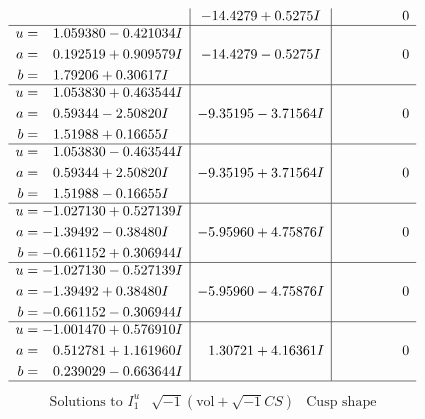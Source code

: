 \documentclass[1p]{elsarticle_modified}
\theoremstyle{definition}
\newcommand{\I}{\sqrt{-1}}
\begin{document}
$$\begin{array}{c|c|c}
 & -14.4279 + 0.5275 I & \phantom{-0.000000 } 0 \\ \hline\begin{aligned}
u &= \phantom{-}1.059380 - 0.421034 I \\
a &= \phantom{-}0.192519 + 0.909579 I \\
b &= \phantom{-}1.79206 + 0.30617 I\end{aligned}
 & -14.4279 - 0.5275 I & \phantom{-0.000000 } 0 \\ \hline\begin{aligned}
u &= \phantom{-}1.053830 + 0.463544 I \\
a &= \phantom{-}0.59344 - 2.50820 I \\
b &= \phantom{-}1.51988 + 0.16655 I\end{aligned}
 & -9.35195 - 3.71564 I & \phantom{-0.000000 } 0 \\ \hline\begin{aligned}
u &= \phantom{-}1.053830 - 0.463544 I \\
a &= \phantom{-}0.59344 + 2.50820 I \\
b &= \phantom{-}1.51988 - 0.16655 I\end{aligned}
 & -9.35195 + 3.71564 I & \phantom{-0.000000 } 0 \\ \hline\begin{aligned}
u &= -1.027130 + 0.527139 I \\
a &= -1.39492 - 0.38480 I \\
b &= -0.661152 + 0.306944 I\end{aligned}
 & -5.95960 + 4.75876 I & \phantom{-0.000000 } 0 \\ \hline\begin{aligned}
u &= -1.027130 - 0.527139 I \\
a &= -1.39492 + 0.38480 I \\
b &= -0.661152 - 0.306944 I\end{aligned}
 & -5.95960 - 4.75876 I & \phantom{-0.000000 } 0 \\ \hline\begin{aligned}
u &= -1.001470 + 0.576910 I \\
a &= \phantom{-}0.512781 + 1.161960 I \\
b &= \phantom{-}0.239029 - 0.663644 I\end{aligned}
 & \phantom{-}1.30721 + 4.16361 I & \phantom{-0.000000 } 0\\
 \hline 
 \end{array}$$\newpage$$\begin{array}{c|c|c}  
\text{Solutions to }I^u_{1}& \I (\text{vol} + \sqrt{-1}CS) & \text{Cusp shape}\\

\end{array}$$
\end{document}
